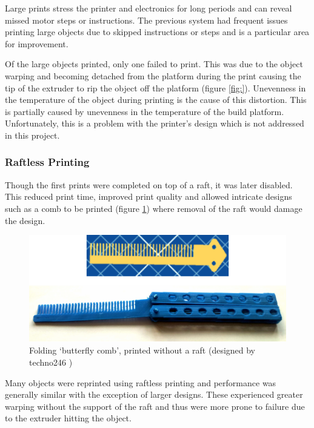 				
				Large prints stress the printer and electronics for long periods and can
				reveal missed motor steps or instructions. The previous system had
				frequent issues printing large objects due to skipped instructions or
				steps and is a particular area for improvement.
				
				Of the large objects printed, only one failed to print. This was due to
				the object warping and becoming detached from the platform during the
				print causing the tip of the extruder to rip the object off the platform
				(figure \ref{fig:}). Unevenness in the temperature of the object during
				printing is the cause of this distortion. This is partially caused by
				unevenness in the temperature of the build platform. Unfortunately, this
				is a problem with the printer's design which is not addressed in this
				project.
				
				
			
			\subsubsection{Raftless Printing}
				
				Though the first prints were completed on top of a raft, it was later
				disabled. This reduced print time, improved print quality and allowed
				intricate designs such as a comb to be printed (figure \ref{fig:comb})
				where removal of the raft would damage the design.
				
				\begin{figure}
					\includegraphics[width=1\textwidth]{diagrams/comb.pdf}
					\caption{Folding `butterfly comb', printed without a raft (designed by
					         techno246 \cite{butterflycomb})}
					\label{fig:comb}
				\end{figure}
				
				Many objects were reprinted using raftless printing and performance was
				generally similar with the exception of larger designs. These
				experienced greater warping without the support of the raft and thus
				were more prone to failure due to the extruder hitting the object.
				
